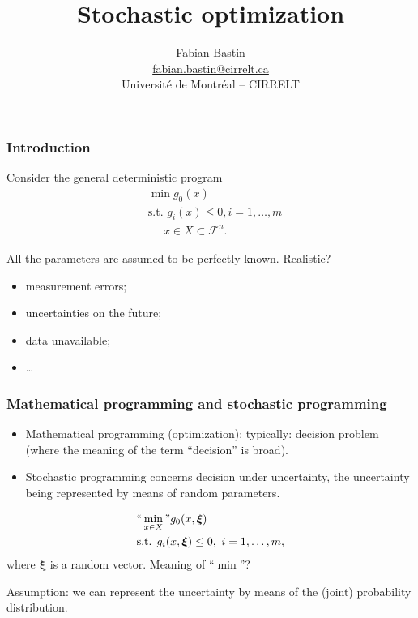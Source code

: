 \documentclass{beamer}
\title[Stochastic optimization]{Stochastic optimization}
\author[Fabian Bastin]{Fabian Bastin \\ \url{fabian.bastin@cirrelt.ca} \\ Université de Montréal -- CIRRELT}
\date{}
\def\bxi{\boldsymbol\xi}
\def\cR {{\mathcal{F}}}
\def\red{\color{red}}
\begin{document}
\frame{\titlepage}

\begin{frame}
\frametitle{Introduction}

Consider the general deterministic program
\[
\begin{split}
& \min g_0(x) \\
& \text{s.t. }g_i(x) \leq 0, i = 1,\ldots{},m \\
& \phantom{t.q. }x \in X \subset \cR^n.
\end{split}
\]

\mbox{}

All the parameters are assumed to be perfectly known. {\color{red} Realistic?}
\begin{itemize}
\item
measurement errors;
\item
uncertainties on the future;
\item
data unavailable;
\item
\ldots
\end{itemize}

\end{frame}

\begin{frame}
\frametitle{Mathematical programming and stochastic programming}

\begin{itemize}
\item
{\red Mathematical programming} (optimization): typically: decision problem (where the meaning of the term ``decision'' is broad).
\item
{\red Stochastic programming} concerns decision under uncertainty, the uncertainty being represented by means of random parameters.
\end{itemize}
\[
\begin{split}
& ``\min_{x \in X}" g_0(x,\bxi) \\
& \text{s.t. }g_i(x, \bxi) \leq 0,\ i=1,\ldots{},m,\\
\end{split}
\]
where $\bxi$ is a random vector. Meaning of ``$\min$''?

\mbox{}

{\red Assumption}: we can represent the uncertainty by means of the (joint) probability distribution.

\end{frame}
\end{document}
